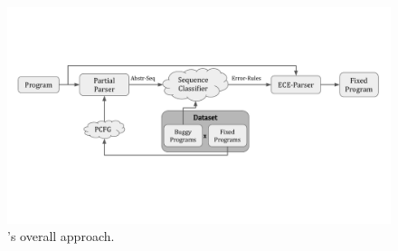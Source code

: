 


\begin{figure}[t]
  \centering
  \includegraphics[trim={0 4.1cm 0 3.85cm}, clip, width=\linewidth]{overall-approach.pdf}
  \caption{\toolname's overall approach.}
  \label{fig:overall-approach}
\end{figure}



